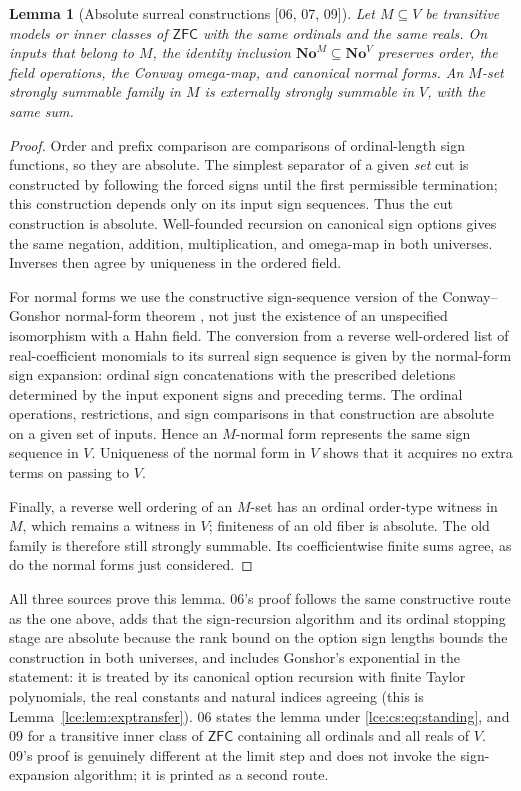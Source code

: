 \documentclass[11pt,letterpaper]{article}
\numberwithin{equation}{section}
\newtheorem{lemma}[theorem]{Lemma}
\theoremstyle{definition}
\theoremstyle{remark}
\newcommand{\No}{\mathbf{No}}
\newcommand{\ZFC}{\mathsf{ZFC}}
\newcommand{\leref}[1]{Lemma~\ref{#1}}
\newcommand{\src}[1]{\textup{\textsf{\small[#1]}}}%
\begin{document}
\begin{lemma}[Absolute surreal constructions \src{06, 07, 09}]\label{lce:lem:absolute}
Let $M\subseteq V$ be transitive models or inner classes of $\ZFC$ with the
same ordinals and the same reals. On inputs that belong to $M$, the identity
inclusion $\No^M\subseteq\No^V$ preserves order, the field operations, the
Conway omega-map, and canonical normal forms. An $M$-set strongly summable
family in $M$ is externally strongly summable in $V$, with the same sum.
\end{lemma}
\begin{proof}
Order and prefix comparison are comparisons of ordinal-length sign
functions, so they are absolute. The simplest separator of a given
\emph{set} cut is constructed by following the forced signs until the
first permissible termination; this construction depends only on its
input sign sequences. Thus the cut construction is absolute. Well-founded
recursion on canonical sign options gives the same negation, addition,
multiplication, and omega-map in both universes. Inverses then agree by
uniqueness in the ordered field.

For normal forms we use the constructive sign-sequence version of the
Conway--Gonshor normal-form theorem \cite[Chapter~5]{Gonshor}, not just the
existence of an unspecified isomorphism with a Hahn field. The conversion
from a reverse well-ordered list of real-coefficient monomials to its
surreal sign sequence is given by the normal-form sign expansion: ordinal
sign concatenations with the prescribed deletions determined by the input
exponent signs and preceding terms. The ordinal operations, restrictions,
and sign comparisons in that construction are absolute on a given set of
inputs. Hence an $M$-normal form represents the same sign sequence in $V$.
Uniqueness of the normal form in $V$ shows that it acquires no extra terms
on passing to $V$.

Finally, a reverse well ordering of an $M$-set has an ordinal order-type
witness in $M$, which remains a witness in $V$; finiteness of an old fiber
is absolute. The old family is therefore still strongly summable. Its
coefficientwise finite sums agree, as do the normal forms just considered.
\end{proof}

All three sources prove this lemma. 06's proof follows the same
constructive route as the one above, adds that the sign-recursion algorithm
and its ordinal stopping stage are absolute because the rank bound on the
option sign lengths bounds the construction in both universes, and includes
Gonshor's exponential in the statement: it is treated by its canonical
option recursion with finite Taylor polynomials, the real constants and
natural indices agreeing (this is \leref{lce:lem:exptransfer}). 06 states
the lemma under \eqref{lce:cs:eq:standing}, and 09 for a transitive inner
class of $\ZFC$ containing all ordinals and all reals of $V$. 09's proof is
genuinely different at the limit step and does not invoke the sign-expansion
algorithm; it is printed as a second route.
\end{document}
